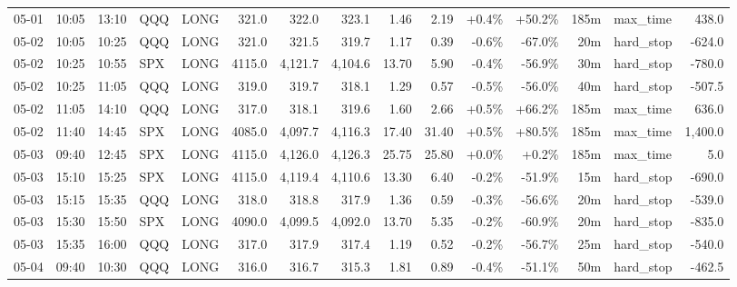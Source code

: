 \documentclass[11pt,a4paper,twoside]{article}
\begin{document}
\begin{landscape}
\begin{center}
\begin{longtable}{>{\color{txtmain}}l l l l l r r r r r r r r >{\color{txtmain}}l r}
05-01 & 10:05 & 13:10 & QQQ & LONG & 321.0 & 322.0 & 323.1 & 1.46 & 2.19 & \textcolor{wingreen}{+0.4\%} & \textcolor{wingreen}{+50.2\%} & 185m & max\_time & \textcolor{wingreen}{438.0} \\
05-02 & 10:05 & 10:25 & QQQ & LONG & 321.0 & 321.5 & 319.7 & 1.17 & 0.39 & \textcolor{lossred}{-0.6\%} & \textcolor{lossred}{-67.0\%} & 20m & hard\_stop & \textcolor{lossred}{-624.0} \\
05-02 & 10:25 & 10:55 & SPX & LONG & 4115.0 & 4,121.7 & 4,104.6 & 13.70 & 5.90 & \textcolor{lossred}{-0.4\%} & \textcolor{lossred}{-56.9\%} & 30m & hard\_stop & \textcolor{lossred}{-780.0} \\
05-02 & 10:25 & 11:05 & QQQ & LONG & 319.0 & 319.7 & 318.1 & 1.29 & 0.57 & \textcolor{lossred}{-0.5\%} & \textcolor{lossred}{-56.0\%} & 40m & hard\_stop & \textcolor{lossred}{-507.5} \\
05-02 & 11:05 & 14:10 & QQQ & LONG & 317.0 & 318.1 & 319.6 & 1.60 & 2.66 & \textcolor{wingreen}{+0.5\%} & \textcolor{wingreen}{+66.2\%} & 185m & max\_time & \textcolor{wingreen}{636.0} \\
05-02 & 11:40 & 14:45 & SPX & LONG & 4085.0 & 4,097.7 & 4,116.3 & 17.40 & 31.40 & \textcolor{wingreen}{+0.5\%} & \textcolor{wingreen}{+80.5\%} & 185m & max\_time & \textcolor{wingreen}{1,400.0} \\
05-03 & 09:40 & 12:45 & SPX & LONG & 4115.0 & 4,126.0 & 4,126.3 & 25.75 & 25.80 & \textcolor{wingreen}{+0.0\%} & \textcolor{wingreen}{+0.2\%} & 185m & max\_time & \textcolor{wingreen}{5.0} \\
05-03 & 15:10 & 15:25 & SPX & LONG & 4115.0 & 4,119.4 & 4,110.6 & 13.30 & 6.40 & \textcolor{lossred}{-0.2\%} & \textcolor{lossred}{-51.9\%} & 15m & hard\_stop & \textcolor{lossred}{-690.0} \\
05-03 & 15:15 & 15:35 & QQQ & LONG & 318.0 & 318.8 & 317.9 & 1.36 & 0.59 & \textcolor{lossred}{-0.3\%} & \textcolor{lossred}{-56.6\%} & 20m & hard\_stop & \textcolor{lossred}{-539.0} \\
05-03 & 15:30 & 15:50 & SPX & LONG & 4090.0 & 4,099.5 & 4,092.0 & 13.70 & 5.35 & \textcolor{lossred}{-0.2\%} & \textcolor{lossred}{-60.9\%} & 20m & hard\_stop & \textcolor{lossred}{-835.0} \\
05-03 & 15:35 & 16:00 & QQQ & LONG & 317.0 & 317.9 & 317.4 & 1.19 & 0.52 & \textcolor{lossred}{-0.2\%} & \textcolor{lossred}{-56.7\%} & 25m & hard\_stop & \textcolor{lossred}{-540.0} \\
05-04 & 09:40 & 10:30 & QQQ & LONG & 316.0 & 316.7 & 315.3 & 1.81 & 0.89 & \textcolor{lossred}{-0.4\%} & \textcolor{lossred}{-51.1\%} & 50m & hard\_stop & \textcolor{lossred}{-462.5} \\

\end{longtable}
\end{center}
\end{landscape}
\end{document}
